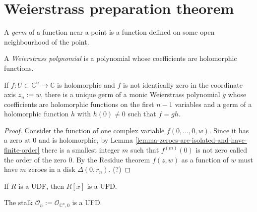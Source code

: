 \section{Weierstrass preparation theorem}
\label{section-Weierstrass-preparation-theorem}

\begin{definition}
\label{definition-germ}
A {\it germ} of a function near a point is a function defined on some open 
neighbourhood of the point.
\end{definition}

\begin{definition}
\label{definition-Weierstrass-polynomial}
A {\it Weierstrass polynomial} is a polynomial whose coefficients are
holomorphic functions.
\end{definition}

\begin{theorem}
\label{theorem-Weierstrass-preparation}
If $f:U\subset\mathbb{C}^n\to\mathbb{C}$ is holomorphic and $f$ is not
identically zero in the coordinate axis $z_n:=w$, there
is a unique germ of a monic Weierstrass polynomial $g$ whose coefficients are
holomorphic functions on the first $n-1$ variables 
and a germ of a holomorphic 
function $h$ with $h(0)\neq 0$ such that $f=gh$.
\end{theorem}

\begin{proof}
Consider the function of one complex variable $f(0,\ldots,0,w)$. Since it has a
zero at $0$ and is holomorphic, by Lemma 
\ref{lemma-zeroes-are-isolated-and-have-finite-order} there is a smallest 
integer $m$ such that $f^{(m)}(0)$ is not zero called the order of the zero $0$.
By the Residue theorem $f(z,w)$ as a function of $w$ must have $m$ zeroes in a
disk $\Delta(0,r_n)$. (?)
\end{proof}

\begin{lemma}
\label{lemma-Gauss-UFD}
If $R$ is a UDF, then $R[x]$ is a UFD.
\end{lemma}

\begin{lemma}
\label{lemma-stalk-is-UFD}
The stalk $\mathcal{O}_n:=\mathcal{O}_{\mathbb{C}^n,0}$ is a UFD.
\end{lemma}

